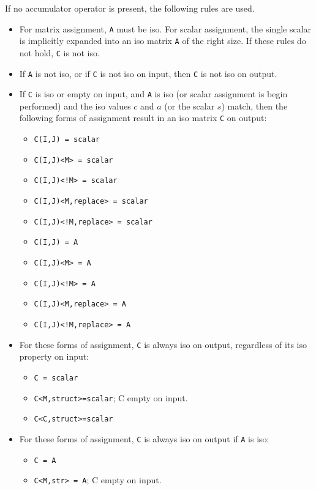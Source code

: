 \documentclass[12pt]{article}
\begin{document}
If no accumulator operator is present, the following rules are used.

\begin{itemize}
\item
For matrix assignment, \verb'A' must be iso.  For scalar assignment, the single
scalar is implicitly expanded into an iso matrix \verb'A' of the right size.
If these rules do not hold, \verb'C' is not iso.

\item
If \verb'A' is not iso, or if \verb'C' is not iso on input, then \verb'C' is
not iso on output.

\item
If \verb'C' is iso or empty on input, and \verb'A' is iso (or scalar assignment
is begin performed) and the iso values $c$ and $a$ (or the scalar $s$) match,
then the following forms of assignment result in an iso matrix \verb'C'  on
output:

                \begin{itemize}
                \item \verb'C(I,J) = scalar'
                \item \verb'C(I,J)<M> = scalar'
                \item \verb'C(I,J)<!M> = scalar'
                \item \verb'C(I,J)<M,replace> = scalar'
                \item \verb'C(I,J)<!M,replace> = scalar'
                \item \verb'C(I,J) = A'
                \item \verb'C(I,J)<M> = A'
                \item \verb'C(I,J)<!M> = A'
                \item \verb'C(I,J)<M,replace> = A'
                \item \verb'C(I,J)<!M,replace> = A'
                \end{itemize}

\item
For these forms of assignment, \verb'C' is always iso on output, regardless
of its iso property on input:

                \begin{itemize}
                \item \verb'C = scalar'
                \item \verb'C<M,struct>=scalar'; C empty on input.
                \item \verb'C<C,struct>=scalar'
                \end{itemize}

\item
For these forms of assignment, \verb'C' is always iso on output if \verb'A'
is iso:

                \begin{itemize}
                \item \verb'C = A'
                \item \verb'C<M,str> = A'; C empty on input.
                \end{itemize}
\end{itemize}
\end{document}
